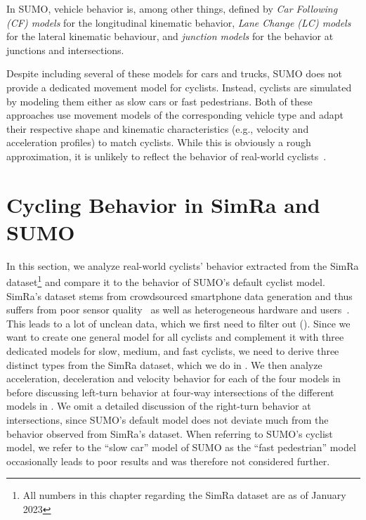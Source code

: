 In SUMO, vehicle behavior is, among other things, defined by
\textit{Car Following (CF) models} for the longitudinal kinematic behavior,
\textit{Lane Change (LC) models} for the lateral kinematic behaviour,
and \textit{junction models} for the behavior at junctions and intersections.

Despite including several of these models for cars and trucks, SUMO does not provide a dedicated movement model for cyclists.
Instead, cyclists are simulated by modeling them either as slow cars or fast pedestrians.
Both of these approaches use movement models of the corresponding vehicle type and adapt their respective shape and kinematic characteristics (e.g., velocity and acceleration profiles) to match cyclists.
While this is obviously a rough approximation, it is unlikely to reflect the behavior of real-world cyclists~\cite{grigoropoulos2019modelling}.


\section{Cycling Behavior in SimRa and SUMO}
\label{sec:cycling_behavior_in_simra_and_sumo}
In this section, we analyze real-world cyclists' behavior extracted from the SimRa dataset\footnote{All numbers in this chapter regarding the SimRa dataset are as of January 2023} and compare it to the behavior of SUMO's default cyclist model.
SimRa's dataset stems from crowdsourced smartphone data generation and thus suffers from poor sensor quality~\cite{chowdhury2014estimating, usami2018bicycle} as well as heterogeneous hardware and users~\cite{basiri2018impact}.
This leads to a lot of unclean data, which we first need to filter out ().
Since we want to create one general model for all cyclists and complement it with three dedicated models for slow, medium, and fast cyclists, we need to derive three distinct types from the SimRa dataset, which we do in .
We then analyze acceleration, deceleration and velocity behavior for each of the four models in  before discussing left-turn behavior at four-way intersections of the different models in .
We omit a detailed discussion of the right-turn behavior at intersections, since SUMO's default model does not deviate much from the behavior observed from SimRa's dataset.
When referring to SUMO's cyclist model, we refer to the ``slow car'' model of SUMO as the ``fast pedestrian'' model occasionally leads to poor results and was therefore not considered further.


